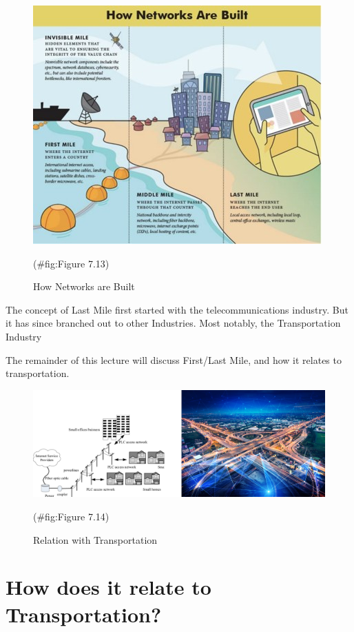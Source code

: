 \documentclass[
]{book}
\begin{document}
\begin{figure}

{\centering \includegraphics{./Images/supplychain/How Networks are Built} 

}

\caption{How Networks are Built}(\#fig:Figure 7.13)
\end{figure}

The concept of Last Mile first started with the telecommunications industry. But it has since branched out to other Industries. Most notably, the Transportation Industry

The remainder of this lecture will discuss First/Last Mile, and how it relates to transportation.

\begin{figure}

{\centering \includegraphics{./Images/supplychain/Relation with Transportation} 

}

\caption{Relation with Transportation}(\#fig:Figure 7.14)
\end{figure}

\hypertarget{SupplyChain-relation}{%
\section{How does it relate to Transportation?}\label{SupplyChain-relation}}
\end{document}
